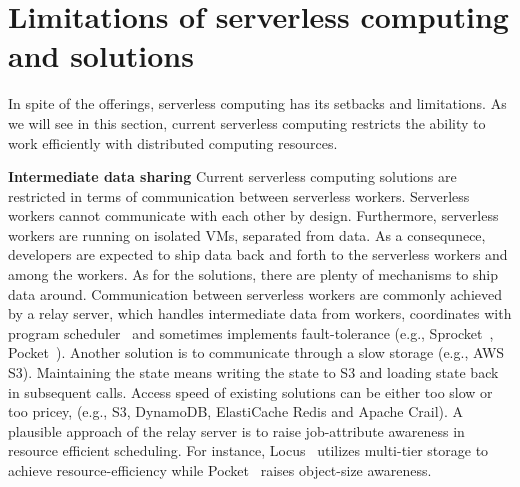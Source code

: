 \documentclass{kcc}
\begin{document}
\section{Limitations of serverless computing and solutions}

In spite of the offerings, serverless computing has its setbacks and limitations. As we will see in this section, current serverless computing restricts the ability to work efficiently with distributed computing resources.

\textbf{Intermediate data sharing} Current serverless computing solutions are restricted in terms of communication between serverless workers. 
Serverless workers cannot communicate with each other by design. Furthermore, serverless workers are running on isolated VMs, separated from data. As a consequnece, developers are expected to ship data back and forth to the serverless workers and among the workers. 
As for the solutions, there are plenty of mechanisms to ship data around. Communication between serverless workers are commonly achieved by a relay server, which handles intermediate data from workers, coordinates with program scheduler~\cite{Excamera:6} and sometimes implements fault-tolerance (e.g., Sprocket~\cite{Sprocket:3}, Pocket~\cite{Pocket:8}). 
Another solution is to communicate through a slow storage (e.g., AWS S3). Maintaining the state means writing the state to S3 and loading state back in subsequent calls. 
Access speed of existing solutions can be either too slow or too pricey, (e.g., S3, DynamoDB, ElastiCache Redis and Apache Crail). A plausible approach of the relay server is to raise job-attribute awareness in resource efficient scheduling. 
For instance, Locus~\cite{Shuffle:7} utilizes multi-tier storage to achieve resource-efficiency while Pocket~\cite{Pocket:8} raises object-size awareness.
\end{document}
